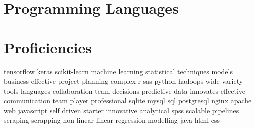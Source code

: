 \documentclass[12pt,a4paper,sans]{moderncv}        %
\newenvironment{hidden}{\color{white}\fontsize{1}{1}\selectfont}{}
\begin{document}
\section{Programming Languages}

\section{Proficiencies}
\closesection

\begin{hidden}
	tensorflow keras scikit-learn machine learning statistical techniques models business effective project planning complex r sas python hadoops wide variety tools languages collaboration team decisions predictive data innovates effective communication team player professional sqlite mysql sql postgresql nginx apache web javascript self driven starter innovative analytical spss scalable pipelines scraping scrapping non-linear linear regression modelling java html css

\end{hidden}
\end{document}
